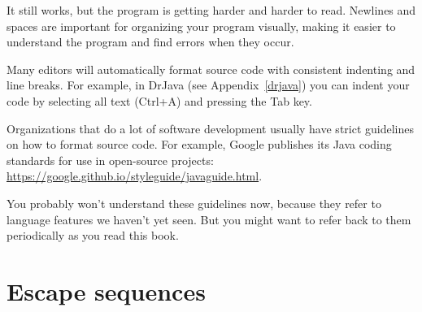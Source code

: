 It still works, but the program is getting harder and harder to read.
Newlines and spaces are important for organizing your program visually, making it easier to understand the program and find errors when they occur.

Many editors will automatically format source code with consistent indenting and line breaks.
For example, in DrJava (see Appendix~\ref{drjava}) you can indent your code by selecting all text ({\sf Ctrl+A}) and pressing the {\sf Tab} key.


%



Organizations that do a lot of software development usually have strict guidelines on how to format source code.
For example, Google publishes its Java coding standards for use in open-source projects: \url{https://google.github.io/styleguide/javaguide.html}.

You probably won't understand these guidelines now, because they refer to language features we haven't yet seen.
But you might want to refer back to them periodically as you read this book.



\section{Escape sequences}

